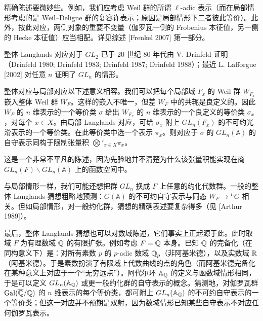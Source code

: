 精确陈述要微妙些。例如，我们应考虑 Weil 群的所谓 $\ell$-adic 表示（而在局部情形考虑的是 Weil--Deligne 群的复容许表示；原因是局部情形下二者彼此等价）。此外，按此对应，两侧对象的重要不变量（伽罗瓦一侧的 Frobenius 本征值，另一侧的 Hecke 本征值）应当相配。详见综述 [Frenkel 2007] 第一部分。

整体 Langlands 对应对于 $GL_2$ 已于 20 世纪 80 年代由 V. Drinfeld 证明（Drinfeld 1980; Drinfeld 1983; Drinfeld 1987; Drinfeld 1988）；最近 L. Lafforgue [2002] 对任意 $n$ 证明了 $GL_n$ 的情形。

整体对应与局部对应以下述意义相容。我们可以把每个局部域 $F_x$ 的 Weil 群 $W_{F_x}$ 嵌入整体 Weil 群 $W_F$。这样的嵌入不唯一，但差 $W_F$ 中的共轭是良定义的。因此 $W_F$ 的 $n$ 维表示的一个等价类 $\sigma$ 给出 $W_{F_x}$ 的 $n$ 维表示的一个良定义的等价类 $\sigma_x$，对每个 $x\in X$。由局部 Langlands 对应，可给 $\sigma_x$ 附上 $GL_n(F_x)$ 的不可约光滑表示的一个等价类。在此等价类中选一个表示 $\pi_x$。则对应于 $\sigma$ 的 $GL_n(\mathbb{A})$ 的自守表示同构于限制张量积 $\bigotimes'_{x\in X}\pi_x$。


这是一个非常不平凡的陈述，因为先验地并不清楚为什么该张量积能实现在商 $GL_n(F)\backslash GL_n(\mathbb{A})$ 上的函数空间中。


与局部情形一样，我们可能还想把群 $GL_n$ 换成 $F$ 上任意的约化代数群。一般的整体 Langlands 猜想粗略地预测：$G(\mathbb{A})$ 的不可约自守表示与同态 $W_F\to{}^L G$ 相关。但如局部情形，对一般约化群，猜想的精确表述要复杂得多（见 [Arthur 1989]）。

最后，整体 Langlands 猜想也可以对数域陈述，它们事实上正起源于此。此时取域 $F$ 为有理数域 $\mathbb{Q}$ 的有限扩张。例如考虑 $F=\mathbb{Q}$ 本身。已知 $\mathbb{Q}$ 的完备化（在同构意义下）是：对所有素数 $p$ 的 $p$-adic 数域 $\mathbb{Q}_p$（非阿基米德），以及实数域 $\mathbb{R}$（阿基米德）。于是素数扮演了有限域上代数曲线的点的角色（而阿基米德完备化在某种意义上对应于一个“无穷远点”）。阿代尔环 $\mathbb{A}_{\mathbb{Q}}$ 的定义与函数域情形相同，于是可以定义 $GL_n(\mathbb{A}_{\mathbb{Q}})$ 或更一般约化群的自守表示的概念。猜测地，对伽罗瓦群 $\operatorname{Gal}(\overline{\mathbb{Q}}/\mathbb{Q})$ 的 $n$ 维表示的每个等价类，都可附上 $GL_n(\mathbb{A}_{\mathbb{Q}})$ 的不可约自守表示的一个等价类；但这一对应并不预期是双射，因为数域情形已知某些自守表示不对应任何伽罗瓦表示。


